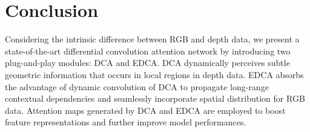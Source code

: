 \documentclass[10pt,twocolumn,letterpaper]{article}
\begin{document}
\section{Conclusion}
Considering the intrinsic difference between RGB and depth data, we present a state-of-the-art differential convolution attention network by
introducing two plug-and-play modules: DCA and EDCA.
DCA dynamically perceives subtle geometric information that occurs in local regions in depth data. EDCA absorbs the advantage of dynamic convolution of DCA to propagate long-range
contextual dependencies and seamlessly incorporate spatial distribution for RGB data. Attention maps generated by DCA and EDCA are employed
to boost feature representations and further improve model performances.

{\small

}
\end{document}
